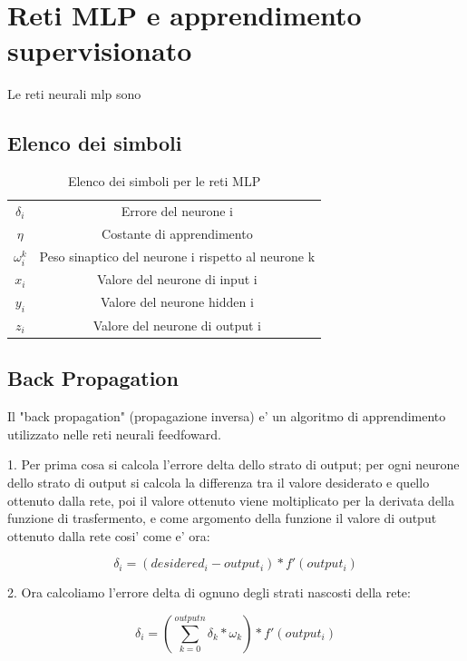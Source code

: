 \documentclass[a4paper,10pt]{book}
\begin{document}
\chapter{Reti MLP e apprendimento supervisionato}
Le reti neurali mlp sono

\section{Elenco dei simboli}
\begin{table}[h]
	\begin{center}
	    \begin{tabular}{  c  c  }
	    $ \delta_i $ & Errore del neurone i \\ 
	    $ \eta $ & Costante di apprendimento \\ 
	    $ \omega_i^k $ & Peso sinaptico del neurone i rispetto al neurone k \\
	    $ x_i $ & Valore del neurone di input i \\ 
	    $ y_i $ & Valore del neurone hidden i \\ 
	    $ z_i $ & Valore del neurone di output i \\ 
	    \end{tabular}
	\end{center}
	\caption{Elenco dei simboli per le reti MLP}
	\label{tab:mlp_symbols}
\end{table}


\section{Back Propagation}
Il "back propagation" (propagazione inversa) e' un algoritmo di apprendimento
utilizzato nelle reti neurali feedfoward. 

1.
Per prima cosa si calcola l'errore delta dello strato di output; per ogni neurone dello 
strato di output si calcola la differenza tra il valore desiderato e quello
ottenuto dalla rete, poi il valore ottenuto viene moltiplicato per la derivata
della funzione di trasfermento, e come argomento della funzione il valore di
output ottenuto dalla rete cosi' come e' ora:

\[
 \delta_i = (desidered_i - output_i) * f'(output_i)
\]


2.
Ora calcoliamo l'errore delta di ognuno degli strati nascosti
della rete:

\[
 \delta_i = (\sum_{k=0}^{outputn}\delta_k * \omega_k) * f'(output_i)
\]
\end{document}
